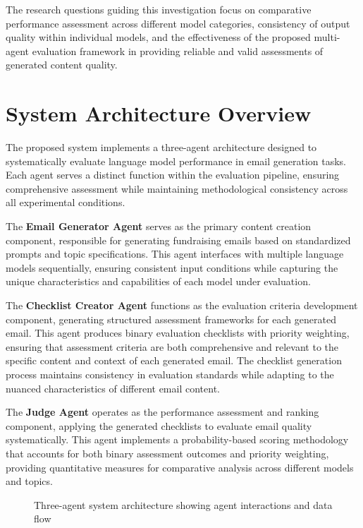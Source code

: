 The research questions guiding this investigation focus on comparative performance assessment across different model categories, consistency of output quality within individual models, and the effectiveness of the proposed multi-agent evaluation framework in providing reliable and valid assessments of generated content quality.

\section{System Architecture Overview}
\label{sec:system-architecture}

The proposed system implements a three-agent architecture designed to systematically evaluate language model performance in email generation tasks. Each agent serves a distinct function within the evaluation pipeline, ensuring comprehensive assessment while maintaining methodological consistency across all experimental conditions.

The \textbf{Email Generator Agent} serves as the primary content creation component, responsible for generating fundraising emails based on standardized prompts and topic specifications. This agent interfaces with multiple language models sequentially, ensuring consistent input conditions while capturing the unique characteristics and capabilities of each model under evaluation.

The \textbf{Checklist Creator Agent} functions as the evaluation criteria development component, generating structured assessment frameworks for each generated email. This agent produces binary evaluation checklists with priority weighting, ensuring that assessment criteria are both comprehensive and relevant to the specific content and context of each generated email. The checklist generation process maintains consistency in evaluation standards while adapting to the nuanced characteristics of different email content.

The \textbf{Judge Agent} operates as the performance assessment and ranking component, applying the generated checklists to evaluate email quality systematically. This agent implements a probability-based scoring methodology that accounts for both binary assessment outcomes and priority weighting, providing quantitative measures for comparative analysis across different models and topics.

\begin{figure}[htbp]
    \centering
    \caption{Three-agent system architecture showing agent interactions and data flow}
    \label{fig:system-architecture}
\end{figure}

